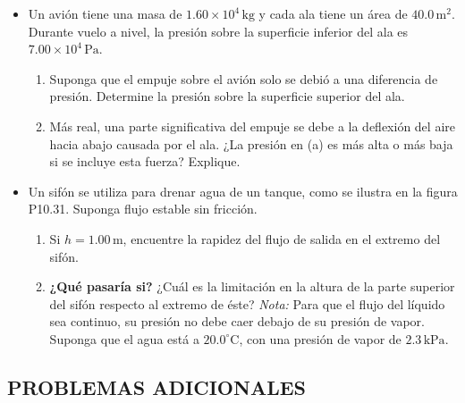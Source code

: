 \documentclass[11pt,a4paper]{article}
\begin{document}
\begin{itemize}
    \item[\textbf{30.}] Un avión tiene una masa de \(1.60 \times 10^4\,\text{kg}\) y cada ala tiene un área de \(40.0\,\text{m}^2\). Durante vuelo a nivel, la presión sobre la superficie inferior del ala es \(7.00 \times 10^4\,\text{Pa}\).
    \begin{enumerate}
        \item Suponga que el empuje sobre el avión solo se debió a una diferencia de presión. Determine la presión sobre la superficie superior del ala.
        \item Más real, una parte significativa del empuje se debe a la deflexión del aire hacia abajo causada por el ala. ¿La presión en (a) es más alta o más baja si se incluye esta fuerza? Explique.
    \end{enumerate}
    \vspace*{7cm}
    
    \item[\textbf{31.}] Un sifón se utiliza para drenar agua de un tanque, como se ilustra en la figura P10.31. Suponga flujo estable sin fricción.
    \begin{enumerate}
        \item Si \(h = 1.00\,\text{m}\), encuentre la rapidez del flujo de salida en el extremo del sifón.
        \item \textbf{¿Qué pasaría si?} ¿Cuál es la limitación en la altura de la parte superior del sifón respecto al extremo de éste? \textit{Nota:} Para que el flujo del líquido sea continuo, su presión no debe caer debajo de su presión de vapor. Suponga que el agua está a \(20.0^\circ\text{C}\), con una presión de vapor de \(2.3\,\text{kPa}\).
    \end{enumerate}
    
    \vspace*{7cm}
\end{itemize}

\newpage

\subsection*{PROBLEMAS ADICIONALES}
\end{document}

